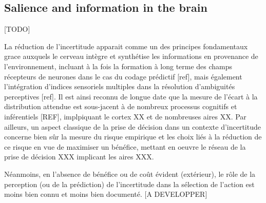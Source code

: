 \documentclass[10pt,letterpaper]{article}
\begin{document}
 





\subsection{Salience and information in the brain}

[TODO]
{\color{blue}
La réduction de l'incertitude apparait comme un des principes fondamentaux grace auxquels le cerveau intègre et synthétise les informations en provenance de l'environnement, incluant à la fois la formation à long terme des champs récepteurs de neurones dans le cas du codage prédictif [ref], mais également l'intégration d'indices sensoriels multiples dans la résolution d'ambiguités perceptives [ref]. %
Il est ainsi reconnu de longue date que la mesure de l'écart à la distribution attendue est sous-jacent à de nombreux processus cognitifs et inférentiels [REF], implpiquant le cortex XX et de nombreuses aires XX.
Par ailleurs, un aspect classique de la prise de décision dans un contexte d'incertitude concerne bien sûr la mesure du risque empirique et les choix liés à la réduction de ce risque en vue de maximiser un bénéfice, mettant en oeuvre le réseau de la prise de décision XXX implicant les aires XXX.

Néanmoins, en l'absence de bénéfice ou de coût évident (extérieur), %
le rôle de la perception (ou de la prédiction) de l'incertitude dans la sélection de l'action est moins bien connu et moins bien documenté. [A DEVELOPPER]}
\end{document}
